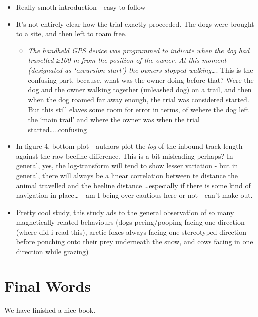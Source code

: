 \documentclass[
]{book}
\providecommand{\tightlist}{%
  \setlength{\itemsep}{0pt}\setlength{\parskip}{0pt}}
\begin{document}
\begin{itemize}
\tightlist
\item
  Really smoth introduction - easy to follow
\item
  It's not entirely clear how the trial exactly proceeded. The dogs were brought to a site, and then left to roam free.

  \begin{itemize}
  \tightlist
  \item
    \emph{The handheld GPS device was programmed to indicate when the dog had travelled ≥100 m from the position of the owner. At this moment (designated as `excursion start') the owners stopped walking\ldots{}}. This is the confusing part, because, what was the owner doing before that? Were the dog and the owner walking together (unleashed dog) on a trail, and then when the dog roamed far away enough, the trial was considered started. But this still elaves some room for error in terms, of wehere the dog left the `main trail' and where the owner was when the trial started\ldots..confusing
  \end{itemize}
\item
  In figure 4, bottom plot - authors plot the \emph{log} of the inbound track length against the raw beeline difference. This is a bit misleading perhaps? In general, yes, the log-transform will tend to show lesser variation - but in general, there will always be a linear correlation between te distance the animal travelled and the beeline distance \ldots especially if there is some kind of navigation in place\ldots{} - am I being over-cautious here or not - can't make out.
\item
  Pretty cool study, this study ads to the general observation of so many magnetically related behaviours (dogs peeing/pooping facing one direction (where did i read this), arctic foxes always facing one stereotyped direction before ponching onto their prey underneath the snow, and cows facing in one direction while grazing)
\end{itemize}

\hypertarget{final-words}{%
\chapter{Final Words}\label{final-words}}

We have finished a nice book.

  
\end{document}
